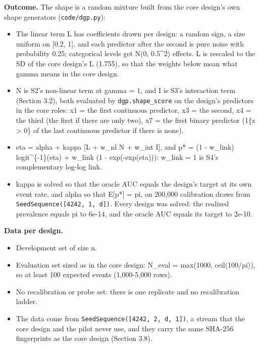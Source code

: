 \documentclass[
  10pt,
]{article}
\newcounter{none} %
\providecommand{\tightlist}{%
  \setlength{\itemsep}{0pt}\setlength{\parskip}{0pt}}
\begin{document}
\textbf{Outcome.} The shape is a random mixture built from
the core design's own shape generators
(\texttt{code/dgp.py}):

\begin{itemize}
\tightlist
\item
  The linear term L has coefficients drawn per design: a
  random sign, a size uniform on {[}0.2, 1{]}, and each
  predictor after the second is pure noise with probability
  0.25; categorical levels get N(0, 0.5\^{}2) effects. L is
  rescaled to the SD of the core design's L (1.755), so that
  the weights below mean what gamma means in the core
  design.
\item
  N is S2's non-linear term at gamma = 1, and I is S3's
  interaction term (Section 3.2), both evaluated by
  \texttt{dgp.shape\_score} on the design's predictors in
  the core roles: x1 = the first continuous predictor, x3 =
  the second, x4 = the third (the first if there are only
  two), x7 = the first binary predictor (1\{z \textgreater{}
  0\} of the last continuous predictor if there is none).
\item
  eta = alpha + kappa {[}L + w\_nl N + w\_int I{]}, and p* =
  (1 - w\_link) logit\^{}\{-1\}(eta) + w\_link (1 -
  exp(-exp(eta))): w\_link = 1 is S4's complementary log-log
  link.
\item
  kappa is solved so that the oracle AUC equals the design's
  target at its own event rate, and alpha so that E{[}p*{]}
  = pi, on 200,000 calibration draws from
  \texttt{SeedSequence({[}4242,\ 1,\ d{]})}. Every design
  was solved: the realized prevalence equals pi to 6e-14,
  and the oracle AUC equals its target to 2e-10.
\end{itemize}

\textbf{Data per design.}

\begin{itemize}
\tightlist
\item
  Development set of size n.
\item
  Evaluation set sized as in the core design: N\_eval =
  max(1000, ceil(100/pi)), so at least 100 expected events
  (1,000-5,000 rows).
\item
  No recalibration or probe set: there is one replicate and
  no recalibration ladder.
\item
  The data come from
  \texttt{SeedSequence({[}4242,\ 2,\ d,\ 1{]})}, a stream
  that the core design and the pilot never use, and they
  carry the same SHA-256 fingerprints as the core design
  (Section 3.8).
\end{itemize}
\end{document}
